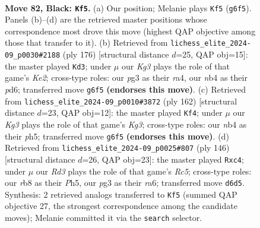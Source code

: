 \documentclass[11pt]{article}
\begin{document}
\clearpage

\begin{figure}[p]\centering
\begin{subfigure}{0.46\textwidth}\centering
\resizebox{\linewidth}{!}{%
\newchessgame
\chessboard[
  setfen={1R6/6p1/3r1pk1/3P3p/1N5P/5KP1/8/8 b - - 4 82},
  showmover=false,
  pgfstyle=straightmove, color=movearrow, markmove={g6-f5}
]}
\caption{}
\end{subfigure}\hfill
\begin{subfigure}{0.46\textwidth}\centering
\resizebox{\linewidth}{!}{%
\newchessgame
\chessboard[
  setfen={8/P1R5/3p4/2pk4/r4p2/5P2/4KP2/8 w - - 1 89},
  showmover=false,
  pgfstyle=straightmove, color=movearrow, markmove={e2-d3}
]}
\caption{}
\end{subfigure}
\\[4pt]
\begin{subfigure}{0.46\textwidth}\centering
\resizebox{\linewidth}{!}{%
\newchessgame
\chessboard[
  setfen={6k1/5p2/6p1/7p/4P2P/5PK1/1R4P1/7r w - - 49 82},
  showmover=false,
  pgfstyle=straightmove, color=movearrow, markmove={g3-f4}
]}
\caption{}
\end{subfigure}\hfill
\begin{subfigure}{0.46\textwidth}\centering
\resizebox{\linewidth}{!}{%
\newchessgame
\chessboard[
  setfen={8/8/r4p1k/2R4P/p1p5/P1P5/1PK5/8 w - - 52 74},
  showmover=false,
  pgfstyle=straightmove, color=movearrow, markmove={c5-c4}
]}
\caption{}
\end{subfigure}
\caption{\textbf{Move 82, Black: \texttt{Kf5}.} (a) Our position; Melanie plays \texttt{Kf5} (\texttt{g6f5}). Panels (b)--(d) are the retrieved master positions whose correspondence most drove this move (highest QAP objective among those that transfer to it). (b) Retrieved from \texttt{lichess\_elite\_2024-09\_p0030\#2188} (ply 176) [structural distance $d$=25, QAP obj=15]: the master played \texttt{Kd3}; under $\mu$ our \emph{Kg3} plays the role of that game's \emph{Ke2}; cross-type roles: our \emph{p}g3 as their \emph{r}a4, our \emph{n}b4 as their \emph{p}d6; transferred move \texttt{g6f5} \textbf{(endorses this move)}. (c) Retrieved from \texttt{lichess\_elite\_2024-09\_p0010\#3872} (ply 162) [structural distance $d$=23, QAP obj=12]: the master played \texttt{Kf4}; under $\mu$ our \emph{Kg3} plays the role of that game's \emph{Kg3}; cross-type roles: our \emph{n}b4 as their \emph{p}h5; transferred move \texttt{g6f5} \textbf{(endorses this move)}. (d) Retrieved from \texttt{lichess\_elite\_2024-09\_p0025\#807} (ply 146) [structural distance $d$=26, QAP obj=23]: the master played \texttt{Rxc4}; under $\mu$ our \emph{Rd3} plays the role of that game's \emph{Rc5}; cross-type roles: our \emph{r}b8 as their \emph{P}h5, our \emph{p}g3 as their \emph{r}a6; transferred move \texttt{d6d5}. Synthesis: 2 retrieved analogs transferred to \texttt{Kf5} (summed QAP objective 27, the strongest correspondence among the candidate moves); Melanie committed it via the \texttt{search} selector.}
\label{fig:thought-m163}
\end{figure}
\end{document}
